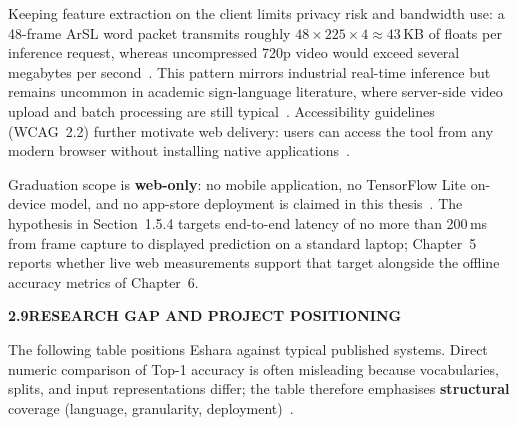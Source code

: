 \noindent Keeping feature extraction on the client limits privacy risk and bandwidth use: a 48-frame ArSL word packet transmits roughly $48 \times 225 \times 4 \approx 43$\,KB of floats per inference request, whereas uncompressed 720p video would exceed several megabytes per second~\cite{rfc6455}. This pattern mirrors industrial real-time inference but remains uncommon in academic sign-language literature, where server-side video upload and batch processing are still typical~\cite{camgoz2018neural,li2020wlasl}. Accessibility guidelines (WCAG~2.2) further motivate web delivery: users can access the tool from any modern browser without installing native applications~\cite{wcag22}.\par\vspace{0.2cm}

\noindent Graduation scope is \textbf{web-only}: no mobile application, no TensorFlow Lite on-device model, and no app-store deployment is claimed in this thesis~\cite{abadi2016tensorflow}. The hypothesis in Section~1.5.4 targets end-to-end latency of no more than 200\,ms from frame capture to displayed prediction on a standard laptop; Chapter~5 reports whether live web measurements support that target alongside the offline accuracy metrics of Chapter~6.\par\vspace{0.3cm}
\clearpage
\noindent\textbf{2.9\quad RESEARCH GAP AND PROJECT POSITIONING}\par
{}
\vspace{0.2cm}

\noindent The following table positions Eshara against typical published systems. Direct numeric comparison of Top-1 accuracy is often misleading because vocabularies, splits, and input representations differ; the table therefore emphasises \textbf{structural} coverage (language, granularity, deployment)~\cite{rastgoo2021survey,li2020wlasl,sidig2021karsl}.\par\vspace{0.2cm}

